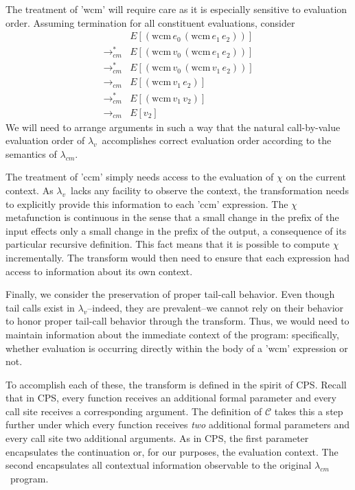 \documentclass{llncs}
\newcommand{\cm}[0]{$\lambda_{cm}$}
\newcommand{\lv}[0]{$\lambda_v$}
\newcommand{\wcm}[2]{(\mathrm{wcm}\,#1\,#2)}
\newcommand{\cmrr}[0]{\rightarrow_{cm}}
\newcommand{\cmrrs}[0]{\rightarrow_{cm}^{*}}
\begin{document}
The treatment of \scheme'wcm' will require care as it is especially sensitive to evaluation order. Assuming termination for all constituent evaluations, consider
\begin{align*}
       &E[\wcm{e_0}{\wcm{e_1}{e_2}}]\\
\cmrrs &E[\wcm{v_0}{\wcm{e_1}{e_2}}]\\
\cmrrs &E[\wcm{v_0}{\wcm{v_1}{e_2}}]\\
\cmrr  &E[\wcm{v_1}{e_2}]\\
\cmrrs &E[\wcm{v_1}{v_2}]\\
\cmrr  &E[v_2]
\end{align*}
We will need to arrange arguments in such a way that the natural call-by-value evaluation order of \lv\ accomplishes correct evaluation order according to the semantics of \cm.

The treatment of \scheme'ccm' simply needs access to the evaluation of $\chi$ on the current context. As \lv\ lacks any facility to observe the context, the transformation needs to explicitly provide this information to each \scheme'ccm' expression. The $\chi$ metafunction is continuous in the sense that a small change in the prefix of the input effects only a small change in the prefix of the output, a consequence of its particular recursive definition. This fact means that it is possible to compute $\chi$ incrementally. The transform would then need to ensure that each expression had access to information about its own context.

Finally, we consider the preservation of proper tail-call behavior. Even though tail calls exist in \lv--indeed, they are prevalent--we cannot rely on their behavior to honor proper tail-call behavior through the transform. Thus, we would need to maintain information about the immediate context of the program: specifically, whether evaluation is occurring directly within the body of a \scheme'wcm' expression or not.

To accomplish each of these, the transform is defined in the spirit of CPS. Recall that in
CPS, every function receives an additional formal parameter and every call site receives a
corresponding argument. The definition of $\mathcal{C}$ takes this a step further under
which every function receives \emph{two} additional formal parameters and every call site
two additional arguments. As in CPS, the first parameter encapsulates the continuation or,
for our purposes, the evaluation context. The second encapsulates all contextual
information observable to the original \cm\ program.
\end{document}

